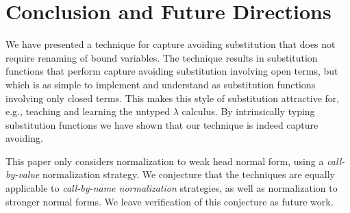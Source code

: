 \section{Conclusion and Future Directions}
\label{sec:conclusion}

We have presented a technique for capture avoiding substitution that does not require renaming of bound variables.
The technique results in substitution functions that perform capture avoiding substitution involving open terms, but which is as simple to implement and understand as substitution functions involving only closed terms.
This makes this style of substitution attractive for, e.g., teaching and learning the untyped $\lambda$ calculus.
By intrinsically typing substitution functions we have shown that our technique is indeed capture avoiding.

This paper only considers normalization to weak head normal form, using a \emph{call-by-value} normalization strategy.
We conjecture that the techniques are equally applicable to \emph{call-by-name normalization} strategies, as well as normalization to stronger normal forms.
We leave verification of this conjecture as future work.